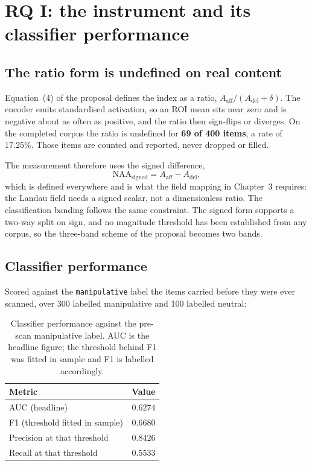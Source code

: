 \section{RQ I: the instrument and its classifier performance}
\label{sec:rq1}

\subsection{The ratio form is undefined on real content}

Equation~(4) of the proposal defines the index as a ratio, $A_{\mathrm{aff}} /
(A_{\mathrm{del}} + \delta)$. The encoder emits standardised activation, so an ROI mean sits
near zero and is negative about as often as positive, and the ratio then sign-flips or
diverges. On the completed corpus the ratio is undefined for \textbf{69 of 400 items}, a rate
of $17.25\%$. Those items are counted and reported, never dropped or filled.

The measurement therefore uses the signed difference,
\begin{equation}
\mathrm{NAA}_{\text{signed}} = A_{\mathrm{aff}} - A_{\mathrm{del}},
\end{equation}
which is defined everywhere and is what the field mapping in Chapter~3 requires: the Landau
field needs a signed scalar, not a dimensionless ratio. The classification banding follows
the same constraint. The signed form supports a two-way split on sign, and no magnitude
threshold has been established from any corpus, so the three-band scheme of the proposal
becomes two bands.

\subsection{Classifier performance}

Scored against the \texttt{manipulative} label the items carried before they were ever
scanned, over 300 labelled manipulative and 100 labelled neutral:

\begin{table}[htbp]
\centering
\begin{tabular}{@{}lr@{}}
\toprule
\textbf{Metric} & \textbf{Value} \\
\midrule
AUC (headline)              & $0.6274$ \\
F1 (threshold fitted in sample) & $0.6680$ \\
Precision at that threshold & $0.8426$ \\
Recall at that threshold    & $0.5533$ \\
\bottomrule
\end{tabular}
\caption{Classifier performance against the pre-scan manipulative label. AUC is the headline figure; the threshold behind F1 was fitted in sample and F1 is labelled accordingly.}
\label{tab:classifier}
\end{table}

